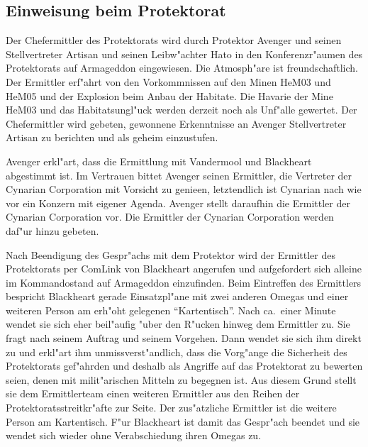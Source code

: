 \subsection{Einweisung beim Protektorat}

Der Chefermittler des Protektorats wird durch Protektor Avenger und seinen Stellvertreter Artisan und seinen Leibw"achter Hato in den Konferenzr"aumen des Protektorats auf Armageddon eingewiesen. Die Atmosph"are ist freundschaftlich. Der Ermittler erf"ahrt von den Vorkommnissen auf den Minen HeM03 und HeM05 und der Explosion beim Anbau der Habitate. Die Havarie der Mine HeM03 und das Habitatsungl"uck werden derzeit noch als Unf"alle gewertet. Der Chefermittler wird gebeten, gewonnene Erkenntnisse an Avenger Stellvertreter Artisan zu berichten und als geheim einzustufen.

Avenger erkl"art, dass die Ermittlung mit Vandermool und Blackheart abgestimmt ist. Im Vertrauen bittet Avenger seinen Ermittler, die Vertreter der Cynarian Corporation mit Vorsicht zu genie\3en, letztendlich ist Cynarian nach wie vor ein Konzern mit eigener Agenda. Avenger stellt daraufhin die Ermittler der Cynarian Corporation vor. Die Ermittler der Cynarian Corporation werden daf"ur hinzu gebeten.

Nach Beendigung des Gespr"achs mit dem Protektor wird der Ermittler des Protektorats per ComLink von Blackheart angerufen und aufgefordert sich alleine im Kommandostand auf Armageddon einzufinden. Beim Eintreffen des Ermittlers bespricht Blackheart gerade Einsatzpl"ane mit zwei anderen Omegas und einer weiteren Person am erh"oht gelegenen "`Kartentisch"'. Nach ca.~einer Minute  wendet sie sich eher beil"aufig "uber den R"ucken hinweg dem Ermittler zu. Sie fragt nach seinem Auftrag und seinem Vorgehen. Dann wendet sie sich ihm direkt zu und erkl"art ihm unmissverst"andlich, dass die Vorg"ange die Sicherheit des Protektorats gef"ahrden und deshalb als Angriffe auf das Protektorat zu bewerten seien, denen mit milit"arischen Mitteln zu begegnen ist. Aus diesem Grund stellt sie dem Ermittlerteam einen weiteren Ermittler aus den Reihen der Protektoratsstreitkr"afte zur Seite. Der zus"atzliche Ermittler ist die weitere Person am Kartentisch. F"ur Blackheart ist damit das Gespr"ach beendet und sie wendet sich wieder ohne Verabschiedung ihren Omegas zu.

